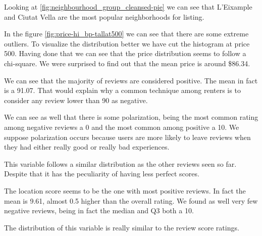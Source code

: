 



Looking at \ref{fig:neighbourhood_group_cleansed-pie} we can see that L'Eixample
and Ciutat Vella are the most popular neighborhoods for listing.


In the figure \ref{fig:price-hi_bp-tallat500} we can see that there are some extreme outliers. To visualize the distribution better we have cut the histogram at price 500. Having done that we can see that the price distribution seems to follow a chi-square. We were surprised to find out that the mean price is 
around \$86.34.



We can see that the majority of reviews are considered positive. The mean in fact is 
a 91.07. That would explain why a common technique among renters is to consider 
any review lower than 90 as negative. 

We can see as well that there is some polarization, being the most common rating among 
negative reviews a 0 and the most common among positive a 10. We suppose polarization occurs
because users are more likely to leave reviews when they had either really good or 
really bad experiences.



This variable follows a similar distribution as the other reviews seen so far. Despite that
it has the peculiarity of having less perfect scores.



The location score seems to be the one with most positive reviews. In fact the mean is 9.61, almost 0.5 higher than the overall rating. We found as well
very few negative reviews, being in fact the median and Q3 both a 10.



The distribution of this variable is really similar to the review score ratings.



